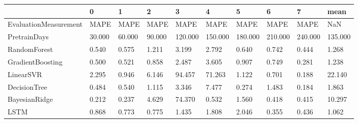 \begin{tabular}{llllllllll}
\toprule
{} &      0 &      1 &      2 &       3 &       4 &       5 &       6 &       7 &    mean \\
\midrule
EvaluationMeasurement &   MAPE &   MAPE &   MAPE &    MAPE &    MAPE &    MAPE &    MAPE &    MAPE &     NaN \\
PretrainDays          & 30.000 & 60.000 & 90.000 & 120.000 & 150.000 & 180.000 & 210.000 & 240.000 & 135.000 \\
RandomForest          &  0.540 &  0.575 &  1.211 &   3.199 &   2.792 &   0.640 &   0.742 &   0.444 &   1.268 \\
GradientBoosting      &  0.500 &  0.521 &  0.858 &   2.487 &   3.605 &   0.907 &   0.749 &   0.281 &   1.238 \\
LinearSVR             &  2.295 &  0.946 &  6.146 &  94.457 &  71.263 &   1.122 &   0.701 &   0.188 &  22.140 \\
DecisionTree          &  0.484 &  0.540 &  1.115 &   3.346 &   7.477 &   0.274 &   1.483 &   0.184 &   1.863 \\
BayesianRidge         &  0.212 &  0.237 &  4.629 &  74.370 &   0.532 &   1.560 &   0.418 &   0.415 &  10.297 \\
LSTM                  &  0.868 &  0.773 &  0.775 &   1.435 &   1.808 &   2.046 &   0.355 &   0.436 &   1.062 \\
\bottomrule
\end{tabular}
